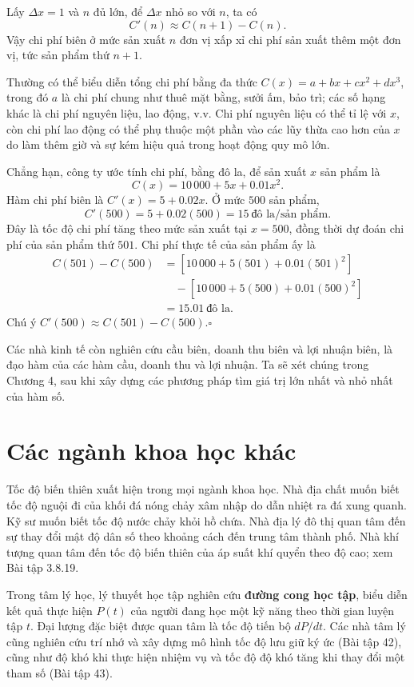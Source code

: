 \documentclass[12pt,a4paper]{article}
\begin{document}
Lấy $\Delta x=1$ và $n$ đủ lớn, để $\Delta x$ nhỏ so với $n$, ta có
\[C'(n)\approx C(n+1)-C(n).\]
Vậy chi phí biên ở mức sản xuất $n$ đơn vị xấp xỉ chi phí sản xuất thêm một đơn vị, tức sản phẩm thứ $n+1$.

Thường có thể biểu diễn tổng chi phí bằng đa thức $C(x)=a+bx+cx^2+dx^3$, trong đó $a$ là chi phí chung như thuê mặt bằng, sưởi ấm, bảo trì; các số hạng khác là chi phí nguyên liệu, lao động, v.v. Chi phí nguyên liệu có thể tỉ lệ với $x$, còn chi phí lao động có thể phụ thuộc một phần vào các lũy thừa cao hơn của $x$ do làm thêm giờ và sự kém hiệu quả trong hoạt động quy mô lớn.

Chẳng hạn, công ty ước tính chi phí, bằng đô la, để sản xuất $x$ sản phẩm là
\[C(x)=10\,000+5x+0.01x^2.\]
Hàm chi phí biên là $C'(x)=5+0.02x$. Ở mức $500$ sản phẩm,
\[C'(500)=5+0.02(500)=15\ \text{đô la/sản phẩm}.\]
Đây là tốc độ chi phí tăng theo mức sản xuất tại $x=500$, đồng thời dự đoán chi phí của sản phẩm thứ $501$. Chi phí thực tế của sản phẩm ấy là
\begin{align*}
C(501)-C(500)&=[10\,000+5(501)+0.01(501)^2]\\
&\quad-[10\,000+5(500)+0.01(500)^2]\\
&=15.01\ \text{đô la}.
\end{align*}
Chú ý $C'(500)\approx C(501)-C(500)$.\hfill$\square$

Các nhà kinh tế còn nghiên cứu cầu biên, doanh thu biên và lợi nhuận biên, là đạo hàm của các hàm cầu, doanh thu và lợi nhuận. Ta sẽ xét chúng trong Chương 4, sau khi xây dựng các phương pháp tìm giá trị lớn nhất và nhỏ nhất của hàm số.
\section*{Các ngành khoa học khác}
Tốc độ biến thiên xuất hiện trong mọi ngành khoa học. Nhà địa chất muốn biết tốc độ nguội đi của khối đá nóng chảy xâm nhập do dẫn nhiệt ra đá xung quanh. Kỹ sư muốn biết tốc độ nước chảy khỏi hồ chứa. Nhà địa lý đô thị quan tâm đến sự thay đổi mật độ dân số theo khoảng cách đến trung tâm thành phố. Nhà khí tượng quan tâm đến tốc độ biến thiên của áp suất khí quyển theo độ cao; xem Bài tập 3.8.19.

Trong tâm lý học, lý thuyết học tập nghiên cứu \textbf{đường cong học tập}, biểu diễn kết quả thực hiện $P(t)$ của người đang học một kỹ năng theo thời gian luyện tập $t$. Đại lượng đặc biệt được quan tâm là tốc độ tiến bộ $dP/dt$. Các nhà tâm lý cũng nghiên cứu trí nhớ và xây dựng mô hình tốc độ lưu giữ ký ức (Bài tập 42), cũng như độ khó khi thực hiện nhiệm vụ và tốc độ độ khó tăng khi thay đổi một tham số (Bài tập 43).
\end{document}
